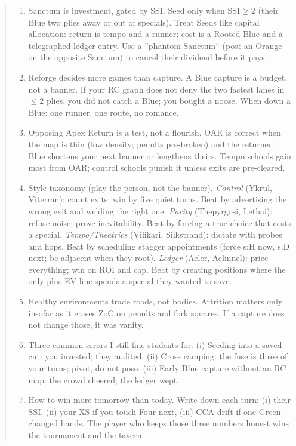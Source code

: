 \documentclass[11pt]{article}
\begin{document}
\begin{quote}
\begin{tcolorbox}[enhanced,breakable,
  colback=royal!3, colframe=royal!70!black, boxrule=0.6pt,
  title={Fenwood's Memorandum on the Canray Theory}]
\begin{enumerate}[leftmargin=\textit{,itemsep=0.5em,label=\textbf{Thesis \Roman}.}]
\item Sanctum is investment, gated by SSI. Seed only when $\mathrm{SSI}\ge 2$ (their Blue two plies away or out of specials). Treat Seeds like capital allocation: return is tempo and a runner; cost is a Rooted Blue and a telegraphed ledger entry. Use a ''phantom Sanctum`` (post an Orange on the opposite Sanctum) to cancel their dividend before it pays.

\item Reforge decides more games than capture. A Blue capture is a budget, not a banner. If your RC graph does not deny the two fastest lanes in $\le 2$ plies, you did not catch a Blue; you bought a noose. When down a Blue: one runner, one route, no romance.

\item Opposing Apex Return is a test, not a flourish. OAR is correct when the map is thin (low density; penults pre-broken) and the returned Blue shortens your next banner or lengthens theirs. Tempo schools gain most from OAR; control schools punish it unless exits are pre-cleared.

\item Style taxonomy (play the person, not the banner).
\emph{Control} (Ykrul, Viterran): count exits; win by five quiet turns. Beat by advertising the wrong exit and welding the right one.
\emph{Parity} (Thepyrgosi, Lethai): refuse noise; prove inevitability. Beat by forcing a true choice that costs a special.
\emph{Tempo/Theatrics} (Vilikari, Silkstrand): dictate with probes and hops. Beat by scheduling stagger appointments (force s{:}H now, s{:}D next; be adjacent when they root).
\emph{Ledger} (Aeler, Aelinnel): price everything; win on ROI and cap. Beat by creating positions where the only plus-EV line spends a special they wanted to save.

\item Healthy environments trade roads, not bodies. Attrition matters only insofar as it erases ZoC on penults and fork squares. If a capture does not change those, it was vanity.

\item Three common errors I still fine students for.
(i) Seeding into a saved cut: you invested; they audited.
(ii) Cross camping: the fuse is three of your turns; pivot, do not pose.
(iii) Early Blue capture without an RC map: the crowd cheered; the ledger wept.

\item How to win more tomorrow than today. Write down each turn: (i) their SSI, (ii) your XS if you touch Four next, (iii) CCA drift if one Green changed hands. The player who keeps those three numbers honest wins the tournament and the tavern.


\end{enumerate}
\end{tcolorbox}
\end{quote}
\end{document}
